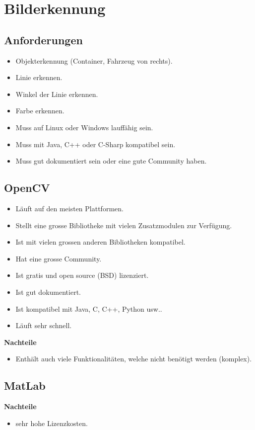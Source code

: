 \section{Bilderkennung}

\subsection {Anforderungen}
\begin{itemize}
\item Objekterkennung (Container, Fahrzeug von rechts).
\item Linie erkennen.
\item Winkel der Linie erkennen.
\item Farbe erkennen.
\item Muss auf Linux oder Windows lauffähig sein.
\item Muss mit Java, C++ oder C-Sharp kompatibel sein.
\item Muss gut dokumentiert sein oder eine gute Community haben.
\end{itemize}

\subsection {OpenCV}

\begin{itemize}
\item Läuft auf den meisten Plattformen.
\item Stellt eine grosse Bibliotheke mit vielen Zusatzmodulen zur Verfügung.
\item Ist mit vielen grossen anderen Bibliotheken kompatibel.
\item Hat eine grosse Community.
\item Ist gratis und open source (BSD) lizenziert.
\item Ist gut dokumentiert.
\item Ist kompatibel mit Java, C, C++, Python usw..
\item Läuft sehr schnell.
\end{itemize}

\textbf {Nachteile}
\begin{itemize}
\item Enthält auch viele Funktionalitäten, welche nicht benötigt werden (komplex).		
\end{itemize}


\subsection {MatLab}
\textbf {Nachteile}
\begin{itemize}
\item sehr hohe Lizenzkosten.		
\end{itemize}

